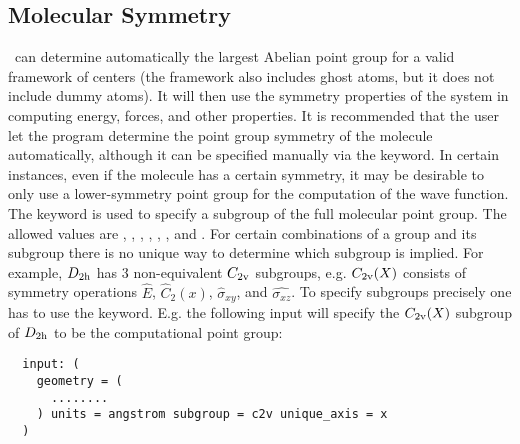 \subsection{Molecular Symmetry}
\PSIthree\ can determine automatically the largest Abelian point group
for a valid framework of centers (the framework also includes ghost
atoms, but it does not include dummy atoms).  It will then use the
symmetry properties of the system in computing energy, forces, and
other properties.  It is recommended that the user let the program
determine the point group symmetry of the molecule automatically,
although it can be specified manually via the  keyword.
In certain instances, even if the molecule has a certain symmetry, it may
be desirable to only use a lower-symmetry point group for the computation
of the wave function.  The keyword  is used to specify
a subgroup of the full molecular point group. The allowed values are
, , , , ,
, and . For certain combinations of a group
and its subgroup there is no unique way to determine which subgroup
is implied. For example, $D_{\rm 2h}$ has 3 non-equivalent $C_{\rm
2v}$ subgroups, e.g. $C_{\rm 2v}(X)$ consists of symmetry operations
$\hat{E}$, $\hat{C}_2(x)$, $\hat{\sigma}_{xy}$, and $\hat{\sigma_{xz}}$.
To specify subgroups precisely one has to use the 
keyword. E.g. the following input will specify the $C_{\rm 2v}(X)$
subgroup of $D_{\rm 2h}$ to be the computational point group:
\begin{verbatim}
  input: (
    geometry = (
      ........
    ) units = angstrom subgroup = c2v unique_axis = x
  )
\end{verbatim}


